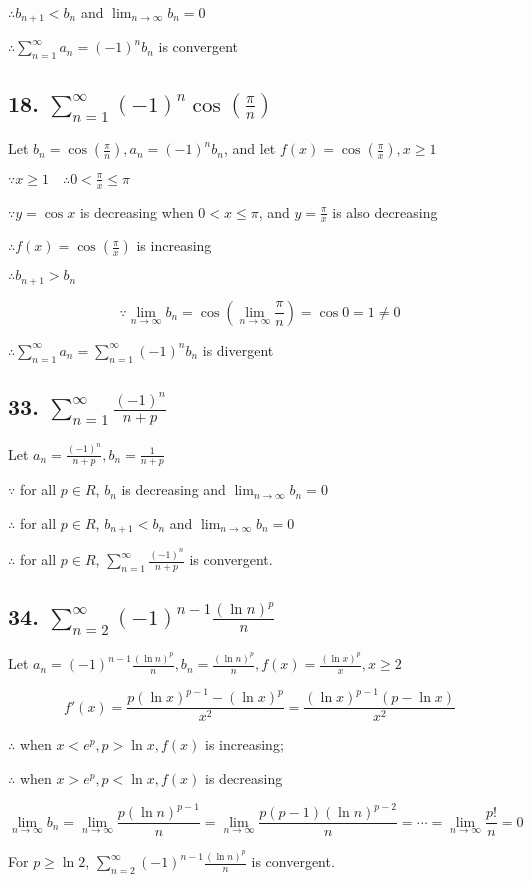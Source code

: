 \documentclass{article}
\begin{document}
    $\therefore b_{n+1} < b_n$ and $\lim_{n\to\infty}b_n = 0$

    $\therefore \sum_{n=1}^\infty a_n = (-1)^n b_n$ is convergent

    \subsection*{18. $\sum_{n=1}^\infty (-1)^n\cos(\frac \pi n)$}

    Let $b_n = \cos(\frac \pi n), a_n = (-1)^nb_n$, and let $f(x) = \cos (\frac \pi x), x \geq 1$

    $\because x \geq 1 \quad \therefore 0 < \frac \pi x \leq \pi$
    
    $\because y=\cos x$ is decreasing when $0 < x \leq \pi$, and $y=\frac \pi x$ is also decreasing

    $\therefore f(x) = \cos(\frac \pi x)$ is increasing

    $\therefore b_{n+1} > b_n$

    $$\because \lim_{n\to\infty} b_n = \cos (\lim_{n\to\infty}\frac \pi n) = \cos 0 = 1 \not = 0$$

    $\therefore \sum_{n=1}^\infty a_n = \sum_{n=1}^\infty (-1)^n b_n$ is divergent

    \subsection*{33. $\sum_{n=1}^\infty \frac{(-1)^n}{n+p}$}

    Let $a_n = \frac{(-1)^n}{n+p}, b_n = \frac{1}{n + p}$

    $\because $ for all $p \in R$, $b_n$ is decreasing and $\lim_{n\to\infty} b_n = 0$

    $\therefore $ for all $p \in R$, $b_{n+1} < b_n$  and $\lim_{n\to\infty} b_n = 0$

    $\therefore$ for all $p \in R$, $\sum_{n=1}^\infty \frac{(-1)^n}{n+p}$ is convergent.

    \subsection*{34. $\sum_{n=2}^\infty (-1)^{n-1} \frac{(\ln n)^p}{n}$}

    Let $a_n = (-1)^{n-1} \frac{(\ln n)^p}{n}, b_n = \frac{(\ln n)^p}{n}, f(x) = \frac{(\ln x)^p}{x}, x \geq 2$

    $$f'(x) = \frac{p(\ln x)^{p-1} - (\ln x)^p}{x^2} = \frac{(\ln x)^{p-1}(p - \ln x)}{x^2}$$

    $\therefore$ when $x < e^p, p > \ln x, f(x)$ is increasing;
    
    $\therefore$ when $x > e^p, p < \ln x, f(x)$ is decreasing

    $$\lim_{n\to\infty} b_n = \lim_{n\to\infty}\frac{p(\ln n)^{p-1}}{n} = \lim_{n\to\infty}\frac{p(p-1)(\ln n)^{p-2}}{n} = \cdots = \lim_{n\to\infty}\frac{p!}{n} = 0$$

    For $p\geq \ln 2$, $\sum_{n=2}^\infty (-1)^{n-1} \frac{(\ln n)^p}{n}$ is convergent.
\end{document}
